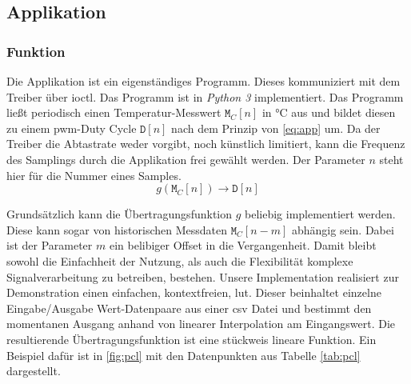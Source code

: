 \subsection{Applikation}

\subsubsection{Funktion}

Die Applikation ist ein eigenständiges Programm.
Dieses kommuniziert mit dem Treiber über \gls{ioctl}.
Das Programm ist in \textit{Python 3} implementiert.
Das Programm ließt periodisch einen Temperatur-Messwert $\texttt{M}_C[n]$ in \si{\celsius} aus und bildet diesen zu einem \gls{pwm}-Duty Cycle $\texttt{D}[n]$ nach dem Prinzip von \autoref{eq:app} um.
Da der Treiber die Abtastrate weder vorgibt, noch künstlich limitiert, kann die Frequenz des Samplings durch die Applikation frei gewählt werden. Der Parameter $n$ steht hier für die Nummer eines Samples.
\begin{equation}
    g \left( \texttt{M}_C \left[n\right] \right) \rightarrow \texttt{D}\left[n\right]
    \label{eq:app}
\end{equation}

Grundsätzlich kann die Übertragungsfunktion $g$ beliebig implementiert werden.
Diese kann sogar von historischen Messdaten $\texttt{M}_C[n-m]$ abhängig sein.
Dabei ist der Parameter $m$ ein belibiger Offset in die Vergangenheit.
Damit bleibt sowohl die Einfachheit der Nutzung, als auch die Flexibilität komplexe Signalverarbeitung zu betreiben, bestehen.
Unsere Implementation realisiert zur Demonstration einen einfachen, kontextfreien, \gls{lut}.
Dieser beinhaltet einzelne Eingabe/Ausgabe Wert-Datenpaare aus einer \gls{csv} Datei und bestimmt den momentanen Ausgang anhand von linearer Interpolation am Eingangswert.
Die resultierende Übertragungsfunktion ist eine stückweis lineare Funktion.
Ein Beispiel dafür ist in \autoref{fig:pcl} mit den Datenpunkten aus Tabelle \ref{tab:pcl} dargestellt.

